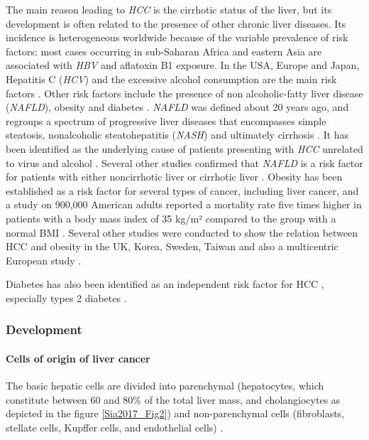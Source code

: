 \documentclass[]{article}
\let\oldparagraph\paragraph
\renewcommand{\paragraph}[1]{\oldparagraph{#1}\mbox{}}
\begin{document}
The main reason leading to \emph{HCC} is the cirrhotic status of the
liver, but its development is often related to the presence of other
chronic liver diseases.
Its incidence is heterogeneous worldwide because of the variable
prevalence of risk factors: most cases occurring in sub-Saharan Africa
and eastern Asia are associated with \emph{HBV} and aflatoxin B1
exposure. In the USA, Europe and Japan, Hepatitis C (\emph{HCV}) and the
excessive alcohol consumption are the main risk factors \cite{Forner2018}. 
Other risk factors include the presence of non alcoholic-fatty liver
disease (\emph{NAFLD}), obesity and diabetes \cite{Marengo2016}. 
\emph{NAFLD} was defined about 20 years ago, and regroups a spectrum of
progressive liver diseases that encompasses simple steatosis,
nonalcoholic steatohepatitis (\emph{NASH}) and ultimately cirrhosis
\cite{Marengo2016}. It has been identified as the
underlying cause of patients presenting with \emph{HCC} unrelated to
virus and alcohol \cite{Marrero2002}.
Several other studies confirmed that \emph{NAFLD} is a risk factor for
patients with either noncirrhotic liver \cite{Paradis2009, Dyson2014} or cirrhotic liver \cite{Wong2014, Ascha2010, Mittal2015}.
Obesity has been established as a risk factor for several types of
cancer, including liver cancer, and a study on 900,000 American adults
reported a mortality rate five times higher in patients with a body mass
index of 35 kg/m² compared to the group with a normal BMI \cite{Calle2003}. Several other studies were conducted to show
the relation between HCC and obesity in the UK, Korea, Sweden, Taiwan
and also a multicentric European study \cite{Chen2008, Schlesinger2012, Samanic2006, Oh2005, Batty2005}.

Diabetes has also been identified as an independent risk factor for HCC
\cite{Forner2018}, especially types 2 diabetes \cite{Noto2010,Wideroff1997,El-Serag2004,Davila2005,Inoue2006}.


\subsubsection*{Development}\label{development}

\paragraph{Cells of origin of liver cancer}\label{cells-of-origin-of-liver-cancer}

The basic hepatic cells are divided into parenchymal (hepatocytes, which
constitute between 60 and 80\% of the total liver mass, and
cholangiocytes as depicted in the figure \ref{Sia2017_Fig2}) and non-parenchymal
cells (fibroblasts, stellate cells, Kupffer cells, and endothelial
cells) \cite{Sia2017}.
\end{document}
